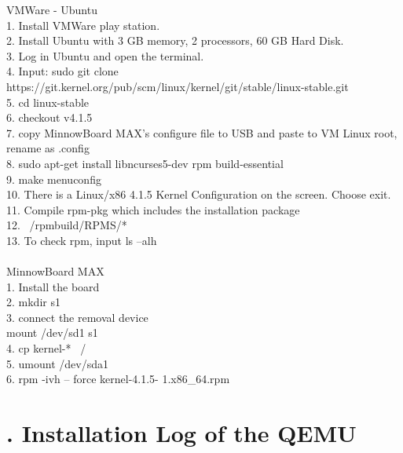 \documentclass[11pt,draftclsnofoot,onecolumn,letterpaper]{IEEEtran}
\begin{document}
VMWare - Ubuntu\\
1.  Install VMWare play station.\\
2.  Install Ubuntu with 3 GB memory, 2 processors, 60 GB Hard Disk.\\
3.  Log in Ubuntu and open the terminal.\\
4.  Input: sudo git clone https://git.kernel.org/pub/scm/linux/kernel/git/stable/linux-stable.git\\
5.  cd linux-stable\\
6.  checkout v4.1.5\\
7.  copy MinnowBoard MAX’s configure file to USB and paste to VM Linux root, rename as .config\\
8.  sudo apt-get install libncurses5-dev rpm build-essential\\
9.  make menuconfig\\
10. There is a Linux/x86 4.1.5 Kernel Configuration on the screen. Choose exit.\\
11. Compile rpm-pkg  which includes the installation package\\
12. ~/rpmbuild/RPMS/*\\
13. To check rpm, input ls –alh\\
\\
MinnowBoard MAX\\
1.  Install the board\\
2.  mkdir s1\\
3.  connect the removal device\\
mount /dev/sd1 s1\\
4.  cp kernel-* ~/\\
5.  umount /dev/sda1\\
6.  rpm -ivh -- force kernel-4.1.5- 1.x86\_64.rpm

\section*{\large{\uppercase\expandafter{}. Installation Log of the QEMU}}
\end{document}
